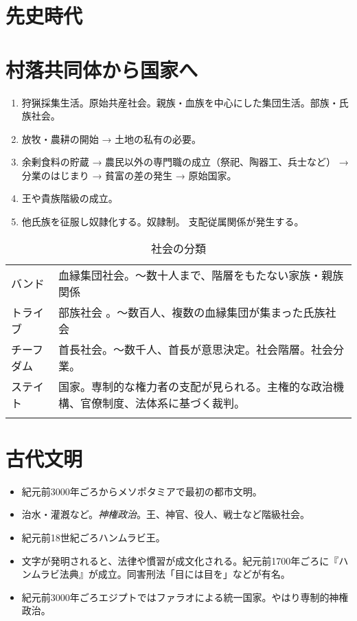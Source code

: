 \documentclass[autodetect-engine,dvipdfmx-if-dvi,ja=standard]{bxjsarticle} \usepackage{mystyle}
\begin{document}
\section{先史時代}





\section{村落共同体から国家へ}

\begin{enumerate}

\item 狩猟採集生活。原始共産社会。親族・血族を中心にした集団生活。部族・氏族社会。
\item 放牧・農耕の開始 → 土地の私有の必要。
\item 余剰食料の貯蔵 →  農民以外の専門職の成立（祭祀、陶器工、兵士など） → 分業のはじまり → 貧富の差の発生 → 原始国家。
\item 王や貴族階級の成立。
\item 他氏族を征服し奴隷化する。奴隷制。 支配従属関係が発生する。
\end{enumerate}


\begin{table}[h]
\caption{社会の分類}
  \centering
  \begin{tabular}{ l l }
\hline{}
    バンド & 血縁集団社会。〜数十人まで、階層をもたない家族・親族関係 \\
    トライブ & 部族社会 。〜数百人、複数の血縁集団が集まった氏族社会 \\
    チーフダム & 首長社会。〜数千人、首長が意思決定。社会階層。社会分業。\\ 
    ステイト & 国家。専制的な権力者の支配が見られる。主権的な政治機構、官僚制度、法体系に基づく裁判。 \\
               \hline{}
                       
     
  \end{tabular}
\end{table}


\section{古代文明}

\begin{itemize}
\item 紀元前3000年ごろからメソポタミアで最初の都市文明。
\item 治水・灌漑など。\emph{神権政治}。王、神官、役人、戦士など階級社会。
\item 紀元前18世紀ごろハンムラビ王。
\item 文字が発明されると、法律や慣習が成文化される。紀元前1700年ごろに『ハンムラビ法典』が成立。同害刑法「目には目を」などが有名。
\item 紀元前3000年ごろエジプトではファラオによる統一国家。やはり専制的神権政治。
\end{itemize}
\end{document}
